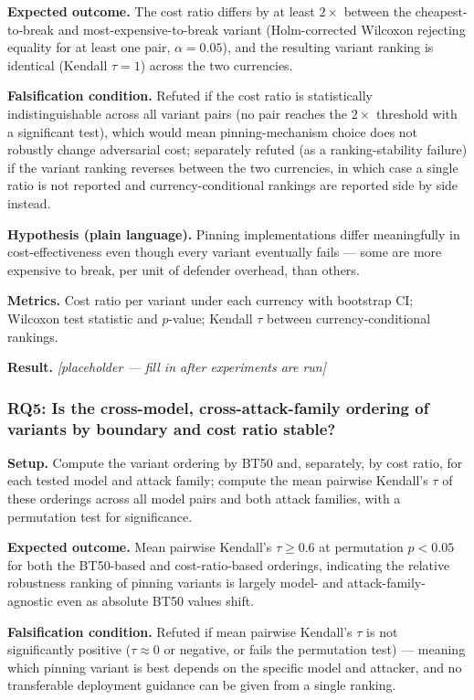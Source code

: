 \documentclass[11pt]{article}
\newcommand{\ph}{\textit{[placeholder --- fill in after experiments are run]}}
\begin{document}
\textbf{Expected outcome.} The cost ratio differs by at least $2\times$ between the cheapest-to-break and most-expensive-to-break variant (Holm-corrected Wilcoxon rejecting equality for at least one pair, $\alpha = 0.05$), and the resulting variant ranking is identical (Kendall $\tau = 1$) across the two currencies.

\textbf{Falsification condition.} Refuted if the cost ratio is statistically indistinguishable across all variant pairs (no pair reaches the $2\times$ threshold with a significant test), which would mean pinning-mechanism choice does not robustly change adversarial cost; separately refuted (as a ranking-stability failure) if the variant ranking reverses between the two currencies, in which case a single ratio is not reported and currency-conditional rankings are reported side by side instead.

\textbf{Hypothesis (plain language).} Pinning implementations differ meaningfully in cost-effectiveness even though every variant eventually fails --- some are more expensive to break, per unit of defender overhead, than others.

\textbf{Metrics.} Cost ratio per variant under each currency with bootstrap CI; Wilcoxon test statistic and $p$-value; Kendall $\tau$ between currency-conditional rankings.

\textbf{Result.} \ph

\subsubsection{RQ5: Is the cross-model, cross-attack-family ordering of variants by boundary and cost ratio stable?}
\textbf{Setup.} Compute the variant ordering by BT50 and, separately, by cost ratio, for each tested model and attack family; compute the mean pairwise Kendall's $\tau$ of these orderings across all model pairs and both attack families, with a permutation test for significance.

\textbf{Expected outcome.} Mean pairwise Kendall's $\tau \geq 0.6$ at permutation $p<0.05$ for both the BT50-based and cost-ratio-based orderings, indicating the relative robustness ranking of pinning variants is largely model- and attack-family-agnostic even as absolute BT50 values shift.

\textbf{Falsification condition.} Refuted if mean pairwise Kendall's $\tau$ is not significantly positive ($\tau \approx 0$ or negative, or fails the permutation test) --- meaning which pinning variant is best depends on the specific model and attacker, and no transferable deployment guidance can be given from a single ranking.
\end{document}
